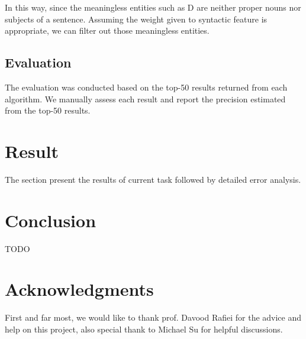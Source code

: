 \documentclass[12pt,a4paper]{article}
\begin{document}
In this way, since the meaningless entities  such as D are neither proper nouns nor subjects of a sentence. Assuming the weight given to syntactic feature is appropriate, we can filter out those meaningless entities. 



\subsection{Evaluation}
The evaluation was conducted based on the top-50 results returned from each algorithm. We manually assess each result and report the precision estimated from the top-50 results.

\section{Result}
The section present the results of current task followed by detailed error analysis. 


\section{Conclusion}
TODO

\section*{Acknowledgments}

First and far most, we would like to thank prof. Davood Rafiei for the advice and help on this project, also special thank to Michael Su for helpful discussions.


\end{document}
